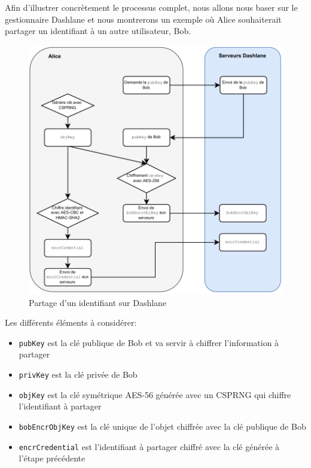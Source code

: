 Afin d'illustrer concrètement le processus complet, nous allons nous baser sur le gestionnaire Dashlane et nous montrerons un exemple où Alice souhaiterait partager un identifiant à un autre utilisateur, Bob.
\newpage 
\begin{figure}[h!]
	\includegraphics[width=15.5cm]{images/dashlane_share_alice.png}
	\centering
	\caption{Partage d'un identifiant sur Dashlane}
\end{figure}

Les différents éléments à considérer:
\begin{itemize}
	\item \verb|pubKey| est la clé publique de Bob et va servir à chiffrer l'information à partager
	\item \verb|privKey| est la clé privée de Bob
	\item \verb|objKey| est la clé symétrique AES-56 générée avec un CSPRNG qui chiffre l'identifiant à partager
	\item \verb|bobEncrObjKey| est la clé unique de l'objet chiffrée avec la clé publique de Bob
	\item \verb|encrCredential| est l'identifiant à partager chiffré avec la clé générée à l'étape précédente
\end{itemize}

